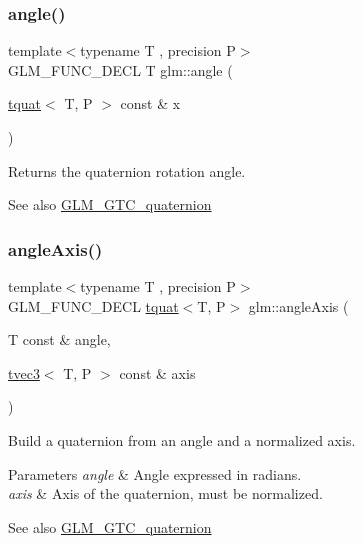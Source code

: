 \subsubsection{\texorpdfstring{angle()}{angle()}}
{\footnotesize\ttfamily template$<$typename T , precision P$>$ \\
G\+L\+M\+\_\+\+F\+U\+N\+C\+\_\+\+D\+E\+CL T glm\+::angle (\begin{DoxyParamCaption}\item[{\hyperlink{structglm_1_1tquat}{tquat}$<$ T, P $>$ const \&}]{x }\end{DoxyParamCaption})}

Returns the quaternion rotation angle.

\begin{DoxySeeAlso}{See also}
\hyperlink{group__gtc__quaternion}{G\+L\+M\+\_\+\+G\+T\+C\+\_\+quaternion} 
\end{DoxySeeAlso}
\mbox{\label{group__gtc__quaternion_ga37ae19405f1ccf766f27e4fcd035d859}} 
\subsubsection{\texorpdfstring{angle\+Axis()}{angleAxis()}}
{\footnotesize\ttfamily template$<$typename T , precision P$>$ \\
G\+L\+M\+\_\+\+F\+U\+N\+C\+\_\+\+D\+E\+CL \hyperlink{structglm_1_1tquat}{tquat}$<$T, P$>$ glm\+::angle\+Axis (\begin{DoxyParamCaption}\item[{T const \&}]{angle,  }\item[{\hyperlink{structglm_1_1tvec3}{tvec3}$<$ T, P $>$ const \&}]{axis }\end{DoxyParamCaption})}

Build a quaternion from an angle and a normalized axis.


\begin{DoxyParams}{Parameters}
{\em angle} & Angle expressed in radians. \\
\hline
{\em axis} & Axis of the quaternion, must be normalized.\\
\hline
\end{DoxyParams}
\begin{DoxySeeAlso}{See also}
\hyperlink{group__gtc__quaternion}{G\+L\+M\+\_\+\+G\+T\+C\+\_\+quaternion} 
\end{DoxySeeAlso}
\mbox{\label{group__gtc__quaternion_ga0b3e87a13b2708154b72259e50789a19}} 

